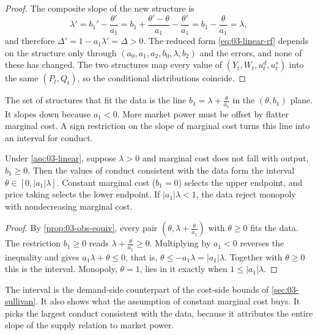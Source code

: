 \begin{proof}
The composite slope of the new structure is
\begin{equation*}
\lambda' = b_1' - \frac{\theta'}{a_1} = b_1 + \frac{\theta' - \theta}{a_1} - \frac{\theta'}{a_1} = b_1 - \frac{\theta}{a_1}
= \lambda ,
\end{equation*}
and therefore $\Delta' = 1 - a_1\lambda' = \Delta > 0$. The reduced form \eqref{eq:03-linear-rf} depends on the structure
only through $(a_0, a_1, a_2, b_0, \lambda, b_2)$ and the errors, and none of these has changed. The two structures map
every value of $(Y_t, W_t, u^d_t, u^s_t)$ into the same $(P_t, Q_t)$, so the conditional distributions coincide.
\end{proof}

The set of structures that fit the data is the line $b_1 = \lambda + \frac{\theta}{a_1}$ in the $(\theta, b_1)$ plane. It
slopes down because $a_1 < 0$. More market power must be offset by flatter marginal cost. A sign restriction on the
slope of marginal cost turns this line into an interval for conduct.

\begin{corollary}\label{cor:03-obs-equiv-bounds}
Under \cref{ass:03-linear}, suppose $\lambda > 0$ and marginal cost does not fall with output, $b_1 \ge 0$. Then the
values of conduct consistent with the data form the interval $\theta \in [0, \lvert a_1\rvert\lambda]$. Constant marginal
cost ($b_1 = 0$) selects the upper endpoint, and price taking selects the lower endpoint. If $\lvert a_1\rvert\lambda < 1$,
the data reject monopoly with nondecreasing marginal cost.
\end{corollary}

\begin{proof}
By \cref{prop:03-obs-equiv}, every pair $(\theta, \lambda + \frac{\theta}{a_1})$ with $\theta \ge 0$ fits the data. The
restriction $b_1 \ge 0$ reads $\lambda + \frac{\theta}{a_1} \ge 0$. Multiplying by $a_1 < 0$ reverses the inequality and gives
$a_1\lambda + \theta \le 0$, that is, $\theta \le -a_1\lambda = \lvert a_1\rvert\lambda$. Together with $\theta \ge 0$ this
is the interval. Monopoly, $\theta = 1$, lies in it exactly when $1 \le \lvert a_1\rvert\lambda$.
\end{proof}

The interval is the demand-side counterpart of the cost-side bounds of \cref{sec:03-sullivan}. It also shows what the
assumption of constant marginal cost buys. It picks the largest conduct consistent with the data, because it attributes
the entire slope of the supply relation to market power.

